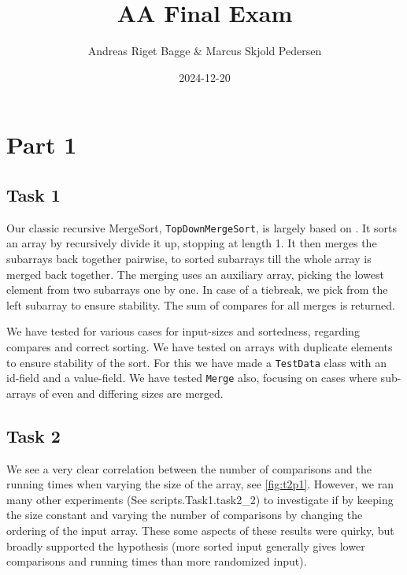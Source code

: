 \documentclass[11pt, a4paper]{article}
\title{AA Final Exam}
\author{Andreas Riget Bagge \& Marcus Skjold Pedersen}
\date{2024-12-20}
\begin{document}
\maketitle

\section{Part 1}

\subsection{Task 1}
Our classic recursive MergeSort, \verb|TopDownMergeSort|, is largely based on \cite{Sedgewick_Wayne_2011}. It sorts an array by recursively divide it up, stopping at length 1. It then merges the subarrays back together pairwise, to sorted subarrays till the whole array is merged back together. The merging uses an auxiliary array, picking the lowest element from two subarrays one by one. In case of a tiebreak, we pick from the left subarray to ensure stability. The sum of compares for all merges is returned.

 We have tested for various cases for input-sizes and sortedness, regarding compares and correct sorting. We have tested on arrays with duplicate elements to ensure stability of the sort. For this we have made a \verb|TestData| class with an id-field and a value-field. We have tested \verb|Merge| also, focusing on cases where sub-arrays of even and differing sizes are merged.

\subsection{Task 2}

We see a very clear correlation between the number of comparisons and the  running times when varying the size of the array, see \ref{fig:t2p1}.
However, we ran many other experiments (See scripts.Task1.task2\_2) to investigate if by keeping the size constant and varying the number of comparisons by changing the ordering of the input array. These some aspects of these results were quirky, but broadly supported the hypothesis (more sorted input generally gives lower comparisons and running times than more randomized input).
\end{document}
